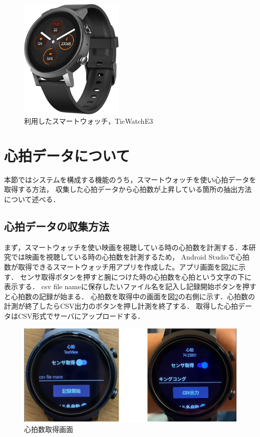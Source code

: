 \begin{figure}[H]
    \centering
    \includegraphics[width=5cm]{images/chapter3/watch.jpg}
    \caption{利用したスマートウォッチ，TicWatchE3}
    \label{watche3}
\end{figure}


\section{心拍データについて}

本節ではシステムを構成する機能のうち，スマートウォッチを使い心拍データを取得する方法，
収集した心拍データから心拍数が上昇している箇所の抽出方法について述べる．

\subsection{心拍データの収集方法}

まず，スマートウォッチを使い映画を視聴している時の心拍数を計測する．本研究では映画を視聴している時の心拍数を計測するため，
Android Studioで心拍数が取得できるスマートウォッチ用アプリを作成した。アプリ画面を図\ref{bpmget}に示す．
センサ取得ボタンを押すと腕につけた時の心拍数を心拍という文字の下に表示する．
csv file nameに保存したいファイル名を記入し記録開始ボタンを押すと心拍数の記録が始まる．
心拍数を取得中の画面を図\ref{bpmget}の右側に示す．心拍数の計測が終了したらCSV出力のボタンを押し計測を終了する．
取得した心拍データはCSV形式でサーバにアップロードする．

\begin{figure}[tbh]
    \centering
    \includegraphics[width=15cm]{images/chapter3/watchgazou.png}
    \caption{心拍数取得画面}
    \label{bpmget}
\end{figure}


